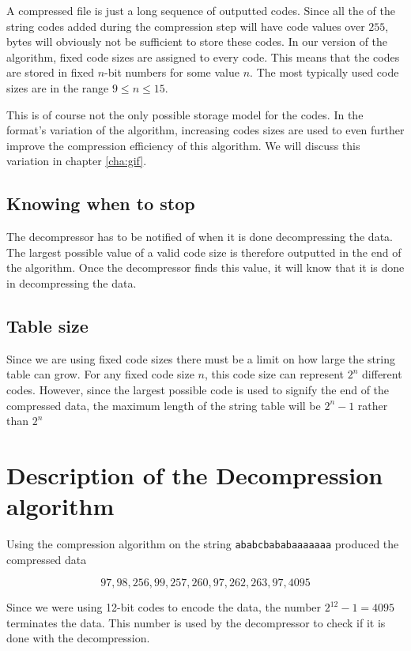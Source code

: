 A \lzw compressed file is just a long sequence of outputted codes.
Since all the of the string codes added during the compression step
will have code values over $255$, bytes will obviously not be
sufficient to store these codes. In our version of the \lzw algorithm,
fixed code sizes are assigned to every code. This means that the codes
are stored in fixed $n$-bit numbers for some value $n$. The most
typically used code sizes are in the range $9 \leq n \leq 15$.

This is of course not the only possible storage model for the
codes. In the \gif format's variation of the \lzw algorithm,
increasing codes sizes are used to even further improve the
compression efficiency of this algorithm. We will discuss this
variation in chapter \ref{cha:gif}.

\subsection{Knowing when to stop}

The decompressor has to be notified of when it is done decompressing
the data. The largest possible value of a valid code size is therefore
outputted in the end of the algorithm. Once the decompressor finds
this value, it will know that it is done in decompressing the data.

\subsection{Table size}

Since we are using fixed code sizes there must be a limit on how large
the string table can grow. For any fixed code size $n$, this code size
can represent $2^n$ different codes. However, since the largest
possible code is used to signify the end of the compressed data, the
maximum length of the string table will be $2^n - 1$ rather than $2^n$

\section{Description of the Decompression algorithm}

Using the compression algorithm \lzw on the string
\texttt{ababcbababaaaaaaa} produced the compressed data

\begin{equation*}
 97,98,256,99,257,260,97,262,263,97,4095
\end{equation*}

Since we were using 12-bit codes to encode the data, the number
$2^{12} - 1 = 4095$ terminates the data. This number is used by the
decompressor to check if it is done with the decompression.


